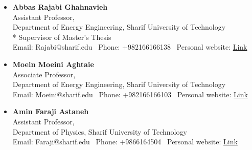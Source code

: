 \documentclass[letter,20pt]{article}
\begin{document}
\begin{itemize}[leftmargin=3ex]
	\item \textbf{Abbas Rajabi Ghahnavieh}\vspace{2pt}\\
	Assistant Professor,\\
	Department of Energy Engineering, Sharif University of Technology\\
    * Supervisor of Master’s Thesis\\
	Email: Rajabi@sharif.edu \textbar\ Phone: +982166166138 \textbar\ Personal website: \href{http://sharif.edu/~rajabi}{Link} \vspace{5pt}
\end{itemize} 

\begin{itemize}[leftmargin=3ex]
	\item \textbf{Moein Moeini Aghtaie}\vspace{2pt}\\
	Associate Professor,\\
	Department of Energy Engineering, Sharif University of Technology\\
	Email: Moeini@sharif.edu \textbar\ Phone: +982166166103 \textbar\ Personal website: \href{http://sina.sharif.edu/~moeini}{Link} \vspace{5pt}
\end{itemize}

\begin{itemize}[leftmargin=3ex]
	\item \textbf{Amin Faraji Astaneh}\vspace{2pt}\\
	Assistant Professor,\\
	Department of Physics, Sharif University of Technology\\
	Email: Faraji@sharif.edu \textbar\ Phone: +9866164504 \textbar\ Personal website: \href{https://sharif.edu/~faraji/}{Link} \vspace{5pt}
\end{itemize}

\vspace{5pt}
\end{document}
